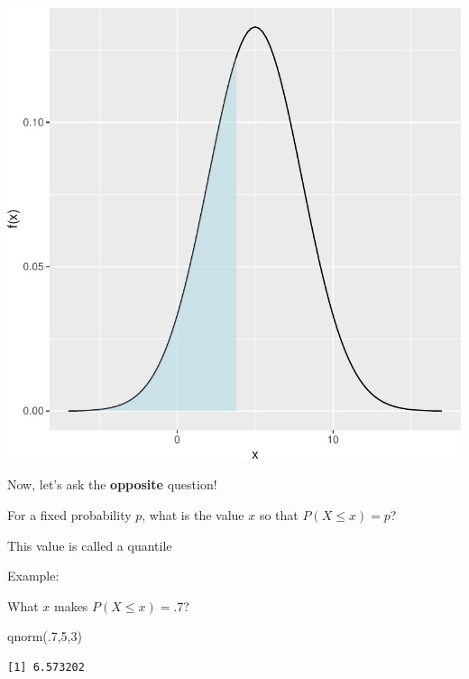 \documentclass[
  letterpaper,
  DIV=11,
  numbers=noendperiod]{scrartcl}
\newenvironment{Shaded}{\begin{snugshade}}{\end{snugshade}}
\newcommand{\DecValTok}[1]{\textcolor[rgb]{0.68,0.00,0.00}{#1}}
\newcommand{\FunctionTok}[1]{\textcolor[rgb]{0.28,0.35,0.67}{#1}}
\newcommand{\NormalTok}[1]{\textcolor[rgb]{0.00,0.23,0.31}{#1}}
\begin{document}
\includegraphics[width=1\linewidth,height=\textheight,keepaspectratio]{chapter3normal_files/figure-pdf/normalProbPlot-1.pdf}

Now, let's ask the \textbf{opposite} question!

For a fixed probability \(p\), what is the value \(x\) so that
\(P(X \leq x) = p\)?

This value is called a {quantile}

{Example:}

What \(x\) makes \(P(X\leq x) = .7\)?

\begin{Shaded}
\begin{Highlighting}[]
\FunctionTok{qnorm}\NormalTok{(.}\DecValTok{7}\NormalTok{,}\DecValTok{5}\NormalTok{,}\DecValTok{3}\NormalTok{)}
\end{Highlighting}
\end{Shaded}

\begin{verbatim}
[1] 6.573202
\end{verbatim}
\end{document}
